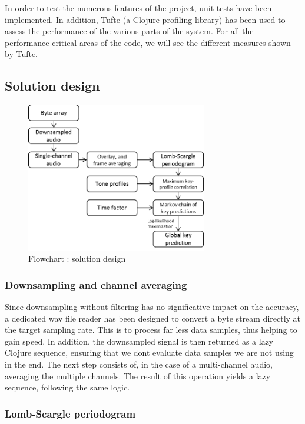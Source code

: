 \documentclass[letterpaper]{article}
\begin{document}
In order to test the numerous features of the project, unit tests have been implemented. In addition, Tufte (a Clojure profiling library) has been used to assess the performance of the various parts of the system. For all the performance-critical areas of the code, we will see the different measures shown by Tufte.\\

\subsection{Solution design}

\begin{figure}[h!]
\begin{center}
\includegraphics[width=3.1in,angle=0]{imgs/flowChart.png}
\caption{Flowchart : solution design}
\label{fig3}
\end{center}
\end{figure}

\subsubsection{Downsampling and channel averaging}

Since downsampling without filtering has no significative impact on the accuracy, a dedicated wav file reader has been designed to convert a byte stream directly
at the target sampling rate. This is to process far less data samples, thus helping to gain speed. In addition, the downsampled signal is then returned as
a lazy Clojure sequence, ensuring that we don\textquotesingle t evaluate data samples we are not using in the end.
The next step consists of, in the case of a multi-channel audio, averaging the multiple channels. The result of this operation yields a lazy sequence, following
the same logic.

\subsubsection{Lomb-Scargle periodogram}
\end{document}
